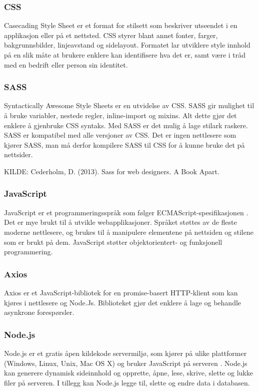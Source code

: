 \subsubsection{CSS}
Casecading Style Sheet \cite{w3c2016hc} er et format for stilsett som beskriver utseendet i en applikasjon eller på et nettsted. CSS styrer blant annet fonter, farger, bakgrunnsbilder, linjeavstand og sidelayout. Formatet lar utviklere style innhold på en slik måte at brukere enklere kan identifisere hva det er, samt være i tråd med en bedrift eller person sin identitet.

\subsubsection{SASS}
Syntactically Awesome Style Sheets\cite{Catlin2006cws} er en utvidelse av CSS. SASS gir mulighet til å bruke variabler, nestede regler, inline-import og mixins. Alt dette gjør det enklere å gjenbruke CSS syntaks. Med SASS er det mulig å lage stilark raskere. SASS er kompatibel med alle versjoner av CSS. Det er ingen nettlesere som kjører SASS, man må derfor kompilere SASS til CSS for å kunne bruke det på nettsider.

KILDE: Cederholm, D. (2013). Sass for web designers. A Book Apart.

\subsubsection{JavaScript}
JavaScript er et programmeringsspråk som følger ECMAScript-spesifikasjonen \cite{mdn2019jav}. Det er mye brukt til å utvikle webapplikasjoner. Språket støttes av de fleste moderne nettlesere, og brukes til å manipulere elementene på nettsiden og stilene som er brukt på dem. JavaScript støtter objektorientert- og funksjonell programmering.

\subsubsection{Axios}
Axios\cite{axios2019a} er et JavaScript-bibliotek for en promise-basert HTTP-klient som kan kjøres i nettlesere og Node.Js. Biblioteket gjør det enklere å lage og behandle asynkrone forespørsler.

\subsubsection{Node.js}
Node.js er et gratis åpen kildekode servermiljø, som kjører på ulike plattformer (Windows, Linux, Unix, Mac OS X) og bruker JavaScript på serveren \cite{w3schools2019win}. Node.js kan generere dynamisk sideinnhold og opprette, åpne, lese, skrive, slette og lukke filer på serveren. I tillegg kan Node.js legge til, slette og endre data i databasen.

